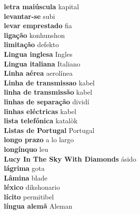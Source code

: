 \textbf{ letra maiúscula  } kapital \\
\textbf{ levantar-se  } subi \\
\textbf{ levar emprestado  } fia \\
\textbf{ ligação  } konhunshon \\
\textbf{ limitação  } defekto \\
\textbf{ Lingua inglesa  } Ingles \\
\textbf{ Lingua italiana  } Italiano \\
\textbf{ Linha aérea  } aerolínea \\
\textbf{ Linha de transmissao  } kabel \\
\textbf{ linha de transmissão  } kabel \\
\textbf{ linhas de separação  } dividí \\
\textbf{ linhas eléctricas  } kabel \\
\textbf{ lista telefónica  } katalòk \\
\textbf{ Listas de Portugal  } Portugal \\
\textbf{ longo prazo  } a lo largo \\
\textbf{ longínquo  } leu \\
\textbf{ Lucy In The Sky With Diamonds  } ásido \\
\textbf{ lágrima  } gota \\
\textbf{ Lâmina  } blade \\
\textbf{ léxico  } dikshonario \\
\textbf{ lícito  } permitibel \\
\textbf{ língua alemã  } Aleman \\
